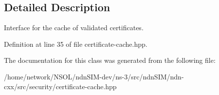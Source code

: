 \subsection{Detailed Description}
Interface for the cache of validated certificates. 

Definition at line 35 of file certificate-\/cache.\+hpp.



The documentation for this class was generated from the following file\+:\begin{DoxyCompactItemize}
\item 
/home/network/\+N\+S\+O\+L/ndn\+S\+I\+M-\/dev/ns-\/3/src/ndn\+S\+I\+M/ndn-\/cxx/src/security/certificate-\/cache.\+hpp\end{DoxyCompactItemize}
